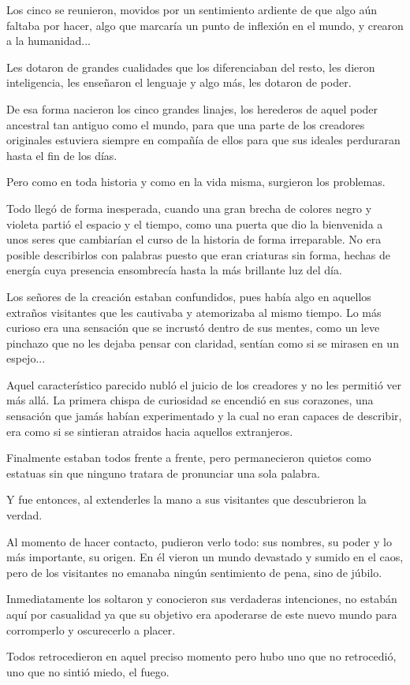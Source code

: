 \documentclass[12pt, a4paper]{book}
\begin{document}
Los cinco se reunieron, movidos por un sentimiento ardiente de que algo aún faltaba por hacer, algo que marcaría un punto de inflexión en el mundo, y crearon a la humanidad...

Les dotaron de grandes cualidades que los diferenciaban del resto, les dieron inteligencia, les enseñaron el lenguaje y algo más, les dotaron de poder.

De esa forma nacieron los cinco grandes linajes, los herederos de aquel poder ancestral tan antiguo como el mundo, para que una parte de los creadores originales estuviera siempre en compañía de ellos para que sus ideales perduraran hasta el fin de los días.

Pero como en toda historia y como en la vida misma, surgieron los problemas.

Todo llegó de forma inesperada, cuando una gran brecha de colores negro y violeta partió el espacio y el tiempo, como una puerta que dio la bienvenida a unos seres que cambiarían el curso de la historia de forma irreparable. No era posible describirlos con palabras puesto que eran criaturas sin forma, hechas de energía cuya presencia ensombrecía hasta la más brillante luz del día.

Los señores de la creación estaban confundidos, pues había algo en aquellos extraños visitantes que les cautivaba y atemorizaba al mismo tiempo. Lo más curioso era una sensación que se incrustó dentro de sus mentes, como un leve pinchazo que no les dejaba pensar con claridad, sentían como si se mirasen en un espejo... 

Aquel característico parecido nubló el juicio de los creadores y no les permitió ver más allá. La primera chispa de curiosidad se encendió en sus corazones, una sensación que jamás habían experimentado y la cual no eran capaces de describir, era como si se sintieran atraidos hacia aquellos extranjeros. 

Finalmente estaban todos frente a frente, pero permanecieron quietos como estatuas sin que ninguno tratara de pronunciar una sola palabra.

Y fue entonces, al extenderles la mano a sus visitantes que descubrieron la verdad.

Al momento de hacer contacto, pudieron verlo todo: sus nombres, su poder y lo más importante, su origen. En él vieron un mundo devastado y sumido en el caos, pero de los visitantes no emanaba ningún sentimiento de pena, sino de júbilo.

Inmediatamente los soltaron y conocieron sus verdaderas intenciones, no estabán aquí por casualidad ya que su objetivo era apoderarse de este nuevo mundo para corromperlo y oscurecerlo a placer.

Todos retrocedieron en aquel preciso momento pero hubo uno que no retrocedió, uno que no sintió miedo, el fuego.
\end{document}
